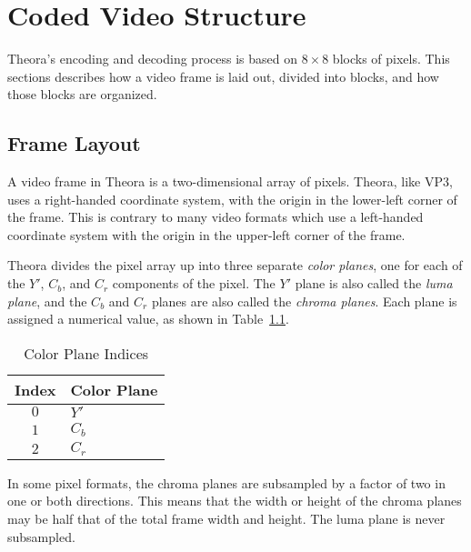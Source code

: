 \documentclass[9pt,letterpaper]{book}
\newcommand{\term}[1]{{\em #1}}
\numberwithin{equation}{chapter}
\numberwithin{figure}{chapter}
\numberwithin{table}{chapter}
\begin{document}
\chapter{Coded Video Structure}

Theora's encoding and decoding process is based on $8\times 8$ blocks of
 pixels.
This sections describes how a video frame is laid out, divided into
 blocks, and how those blocks are organized.

\section{Frame Layout}

A video frame in Theora is a two-dimensional array of pixels.
Theora, like VP3, uses a right-handed coordinate system, with the origin in the
 lower-left corner of the frame.
This is contrary to many video formats which use a left-handed coordinate
 system with the origin in the upper-left corner of the frame.

Theora divides the pixel array up into three separate \term{color planes}, one
 for each of the $Y'$, $C_b$, and $C_r$ components of the pixel.
The $Y'$ plane is also called the \term{luma plane}, and the $C_b$ and $C_r$
 planes are also called the \term{chroma planes}.
Each plane is assigned a numerical value, as shown in
 Table~\ref{tab:color-planes}.

\begin{table}[htbp]
\begin{center}
\begin{tabular}{cl}\toprule
Index & Color Plane \\\midrule
$0$   & $Y'$        \\
$1$   & $C_b$       \\
$2$   & $C_r$       \\
\bottomrule\end{tabular}
\end{center}
\caption{Color Plane Indices}
\label{tab:color-planes}
\end{table}

In some pixel formats, the chroma planes are subsampled by a factor of two
 in one or both directions.
This means that the width or height of the chroma planes may be half that of
 the total frame width and height.
The luma plane is never subsampled.
\end{document}
